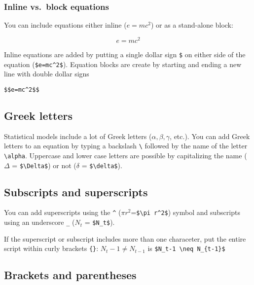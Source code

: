 \documentclass[]{article}
\begin{document}
\hypertarget{inline-vs.block-equations}{%
\subsubsection{Inline vs.~block
equations}\label{inline-vs.block-equations}}

You can include equations either inline (\(e = mc^2\)) or as a
stand-alone block:

\[e=mc^2\]

Inline equations are added by putting a single dollar sign \texttt{\$}
on either side of the equation (\texttt{\$e=mc\^{}2\$}). Equation blocks
are create by starting and ending a new line with double dollar signs

\texttt{\$\$e=mc\^{}2\$\$}

\hypertarget{greek-letters}{%
\subsection{Greek letters}\label{greek-letters}}

Statistical models include a lot of Greek letters
(\(\alpha, \beta, \gamma\), etc.). You can add Greek letters to an
equation by typing a backslash \texttt{\textbackslash{}} followed by the
name of the letter \texttt{\textbackslash{}alpha}. Uppercase and lower
case letters are possible by capitalizing the name (\(\Delta\) =
\texttt{\$\textbackslash{}Delta\$}) or not (\(\delta\) =
\texttt{\$\textbackslash{}delta\$}).

\hypertarget{subscripts-and-superscripts}{%
\subsection{Subscripts and
superscripts}\label{subscripts-and-superscripts}}

You can add superscripts using the \texttt{\^{}}
(\(\pi r^2\)=\texttt{\$\textbackslash{}pi\ r\^{}2\$}) symbol and
subscripts using an underscore \texttt{\_} (\(N_t\) =
\texttt{\$N\_t\$}).

If the superscript or subscript includes more than one characeter, put
the entire script within curly brackets \texttt{\{\}}:
\(N_t-1 \neq N_{t-1}\) is
\texttt{\$N\_t-1\ \textbackslash{}neq\ N\_\{t-1\}\$}

\hypertarget{brackets-and-parentheses}{%
\subsection{Brackets and parentheses}\label{brackets-and-parentheses}}
\end{document}
